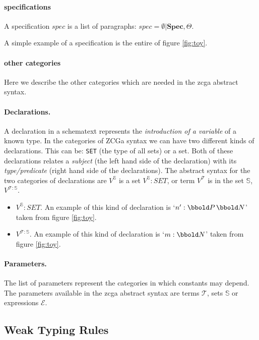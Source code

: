\paragraph{specifications}
A specification $spec$ is a list of paragraphs: $spec= \emptyset \vert
\mathbf{Spec}, \Theta$.

A simple example of a specification is the entire of figure \ref{fig:toy}.

\paragraph{other categories}

Here we describe the other categories which are needed in the \gls{zcga}
abstract syntax.

\paragraph{Declarations.} A declaration in a schematext represents the
\emph{introduction of a variable} of a known type. In the categories of ZCGa
syntax we can have two different kinds of declarations. This can be:
\texttt{SET} (the type of all sets) or a set. Both of these declarations relates
a \emph{subject} (the left hand side of the declaration) with its
\emph{type/predicate} (right hand side of the declarations). The abstract syntax
for the two categories of declarations are $V^{\mathbb{S}}$ is a set
$V^{\mathbb{S}}:SET$, or term $V^{\mathcal{T}}$ is in the set $\mathbb{S}$,
$V^{\mathcal{T}:\mathbb{S}}$.

\begin{itemize}
\item$V^{\mathbb{S}}:SET$. An example of this kind of declaration is `$n':\power
\nat$' taken from figure \ref{fig:toy}.

\item $V^{\mathcal{T}:\mathbb{S}}$. An example of this kind of declaration is
`$m:\nat$' taken from figure \ref{fig:toy}.
\end{itemize}

\paragraph{Parameters.} The list of parameters represent the categories in which
constants may depend. The parameters available in the \gls{zcga} abstract syntax
are terms $\mathcal{T}$, sets $\mathbb{S}$ or expressions $\mathcal{E}$. 

\subsection{Weak Typing Rules}

